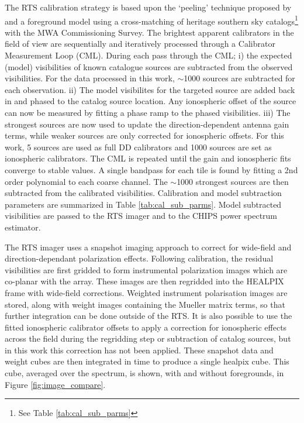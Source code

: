 \documentclass[twolcolumn,iop]{emulateapj}
\begin{document}
The RTS calibration strategy is based upon the `peeling' technique proposed by \cite{Noordam:2004p2379} and a foreground model using a cross-matching of heritage southern sky catalogs\footnote{See Table \ref{tab:cal_sub_parms}} with the MWA Commissioning Survey. The brightest apparent calibrators in the field of view are sequentially and iteratively processed through a Calibrator Measurement Loop (CML). During each pass through the CML; i) the expected (model) visibilities of known catalogue sources are subtracted from the observed visibilities. For the data processed in this work, $\sim$1000 sources are subtracted for each observation. ii) The model visibilites for the targeted source are added back in and phased to the catalog source location. Any ionospheric offset of the source can now be measured by fitting a phase ramp to the phased visibilities. iii) The strongest sources are now used to update the direction-dependent antenna gain terms, while weaker sources are only corrected for ionospheric offsets. For this work, 5 sources are used as full DD calibrators and 1000 sources are set as ionospheric calibrators. The CML is repeated until the gain and ionospheric fits converge to stable values. A single bandpass for each tile is found by fitting a 2nd order polynomial to each coarse channel. The $\sim$1000 strongest sources are then subtracted from the calibrated visibilities.   Calibration and model subtraction parameters are summarized in Table \ref{tab:cal_sub_parms}.  Model subtracted visibilities are passed to the RTS imager and to the CHIPS power spectrum estimator. %

The RTS imager uses a snapshot imaging approach to correct for wide-field and direction-dependant polarization effects. Following calibration, the residual visibilities are first gridded to form instrumental polarization images which are co-planar with the array. These images are then regridded into the HEALPIX \citep{Gorski:2005p7667} frame with wide-field corrections.  Weighted instrument polarisation images are stored, along with weight images containing the Mueller matrix terms, so that further integration can be done outside of the RTS. It is also possible to use the fitted ionospheric calibrator offsets to apply a correction for ionospheric effects across the field during the regridding step or subtraction of catalog sources, but in this work this correction has not been applied. These snapshot data and weight cubes are then integrated in time to produce a single healpix cube. This cube, averaged over the spectrum, is shown, with and without foregrounds, in Figure \ref{fig:image_compare}.
\end{document}
